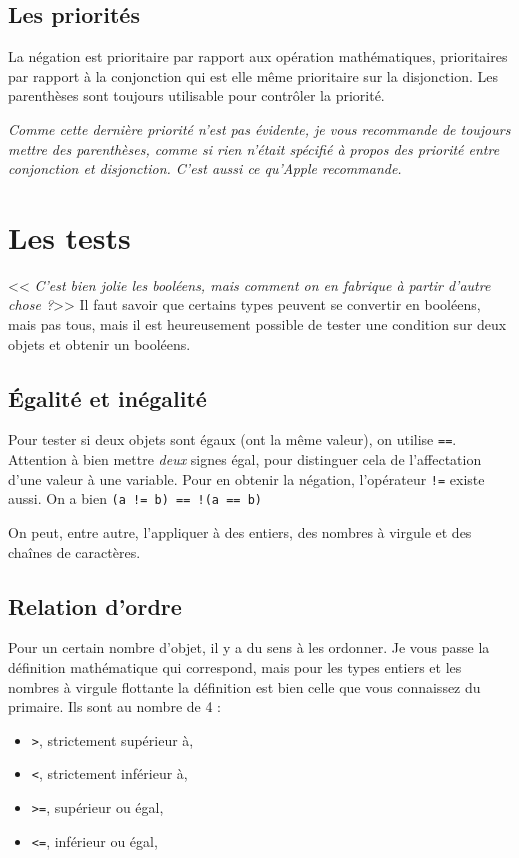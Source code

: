 \subsection{Les priorités}
La négation est prioritaire par rapport aux opération mathématiques, prioritaires par rapport à la conjonction qui est elle même prioritaire sur la disjonction. Les parenthèses sont toujours utilisable pour contrôler la priorité.

\emph{Comme cette dernière priorité n'est pas évidente, je vous recommande de toujours mettre des parenthèses, comme si rien n'était spécifié à propos des priorité entre conjonction et disjonction. C'est aussi ce qu'\emph{Apple} recommande.}
\section{Les tests}
<< \emph{C'est bien jolie les booléens, mais comment on en fabrique à partir d'autre chose ?}>>
Il faut savoir que certains types peuvent se convertir en booléens, mais pas tous, mais il est heureusement possible de tester une condition sur deux objets et obtenir un booléens.
\subsection{Égalité et inégalité}
Pour tester si deux objets sont égaux (ont la même valeur),
on utilise \verb"==". Attention à bien mettre \emph{deux} signes égal, pour distinguer cela de l'affectation d'une valeur à une variable. Pour  en obtenir la négation, l'opérateur \verb"!=" existe aussi. On a bien \texttt{(a != b) == !(a == b)}

On peut, entre autre, l'appliquer à des entiers, des nombres à virgule et des chaînes de caractères.
\subsection{Relation d'ordre}
Pour un certain nombre d'objet, il y a du sens à les ordonner.
Je vous passe la définition mathématique qui correspond, mais pour les types entiers et les nombres à virgule flottante la définition est bien celle que vous connaissez du primaire.
Ils sont au nombre de 4 :
\begin{itemize}
\item \verb">", strictement supérieur à,
\item \verb"<", strictement inférieur à,
\item \verb">=", supérieur ou égal,
\item \verb"<=", inférieur ou égal,
\end{itemize}

